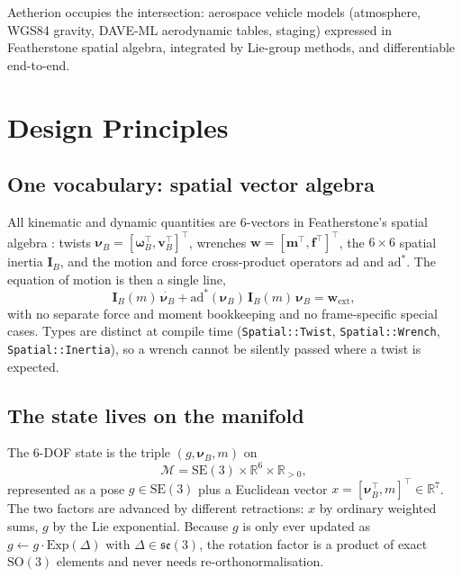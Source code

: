 \documentclass[a4paper,10pt]{article}
\newcommand{\SO}{\mathrm{SO}(3)}
\newcommand{\SE}{\mathrm{SE}(3)}
\newcommand{\se}{\mathfrak{se}(3)}
\newcommand{\Exp}{\mathrm{Exp}}
\newcommand{\ad}{\mathrm{ad}}
\newcommand{\R}{\mathbb{R}}
\newcommand{\nuB}{\boldsymbol{\nu}_B}
\newcommand{\IB}{\mathbf{I}_B}
\newcommand{\wext}{\mathbf{w}_{\mathrm{ext}}}
\newcommand{\code}[1]{\texttt{\small #1}}
\theoremstyle{definition}
\begin{document}
Aetherion occupies the intersection: aerospace vehicle models (atmosphere,
WGS84 gravity, DAVE-ML aerodynamic tables, staging) expressed in Featherstone
spatial algebra, integrated by Lie-group methods, and differentiable
end-to-end.

\section{Design Principles}
\label{sec:design}

\subsection{One vocabulary: spatial vector algebra}

All kinematic and dynamic quantities are 6-vectors in Featherstone's spatial
algebra \citep{featherstone2008rbd}: twists $\nuB = [\boldsymbol{\omega}_B^\top,
\mathbf{v}_B^\top]^\top$, wrenches $\mathbf{w} = [\mathbf{m}^\top,
\mathbf{f}^\top]^\top$, the $6\times6$ spatial inertia $\IB$, and the motion
and force cross-product operators $\ad$ and $\ad^*$.  The equation of motion
is then a single line,
\begin{equation}
  \IB(m)\,\dot{\nuB} + \ad^*(\nuB)\,\IB(m)\,\nuB = \wext,
  \label{eq:newton_euler}
\end{equation}
with no separate force and moment bookkeeping and no frame-specific special
cases.  Types are distinct at compile time (\code{Spatial::Twist},
\code{Spatial::Wrench}, \code{Spatial::Inertia}), so a wrench cannot be
silently passed where a twist is expected.

\subsection{The state lives on the manifold}

The 6-DOF state is the triple $(g, \nuB, m)$ on
\begin{equation}
  \mathcal{M} = \SE \times \R^{6} \times \R_{>0},
\end{equation}
represented as a pose $g \in \SE$ plus a Euclidean vector
$x = [\nuB^\top, m]^\top \in \R^{7}$.  The two factors are advanced by
different retractions: $x$ by ordinary weighted sums, $g$ by the Lie
exponential.  Because $g$ is only ever updated as $g \leftarrow g \cdot
\Exp(\Delta)$ with $\Delta \in \se$, the rotation factor is a product of exact
$\SO$ elements and never needs re-orthonormalisation.
\end{document}
